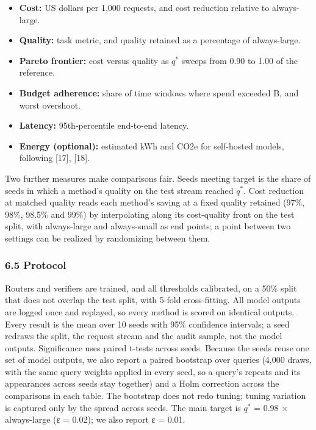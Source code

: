 \documentclass[
  10pt,
]{article}
\providecommand{\tightlist}{%
  \setlength{\itemsep}{0pt}\setlength{\parskip}{0pt}}
\begin{document}
\begin{itemize}
\tightlist
\item
  \textbf{Cost:} US dollars per 1,000 requests, and cost reduction
  relative to always-large.
\item
  \textbf{Quality:} task metric, and quality retained as a percentage of
  always-large.
\item
  \textbf{Pareto frontier:} cost versus quality as \(q^{*}\) sweeps from
  0.90 to 1.00 of the reference.
\item
  \textbf{Budget adherence:} share of time windows where spend exceeded
  B, and worst overshoot.
\item
  \textbf{Latency:} 95th-percentile end-to-end latency.
\item
  \textbf{Energy (optional):} estimated kWh and CO2e for self-hosted
  models, following {[}17{]}, {[}18{]}.
\end{itemize}

Two further measures make comparisons fair. Seeds meeting target is the
share of seeds in which a method's quality on the test stream reached
\(q^{*}\). Cost reduction at matched quality reads each method's saving
at a fixed quality retained (97\%, 98\%, 98.5\% and 99\%) by
interpolating along its cost-quality front on the test split, with
always-large and always-small as end points; a point between two
settings can be realized by randomizing between them.

\subsubsection{6.5 Protocol}\label{protocol}

Routers and verifiers are trained, and all thresholds calibrated, on a
50\% split that does not overlap the test split, with 5-fold
cross-fitting. All model outputs are logged once and replayed, so every
method is scored on identical outputs. Every result is the mean over 10
seeds with 95\% confidence intervals; a seed redraws the split, the
request stream and the audit sample, not the model outputs. Significance
uses paired t-tests across seeds. Because the seeds reuse one set of
model outputs, we also report a paired bootstrap over queries (4,000
draws, with the same query weights applied in every seed, so a query's
repeats and its appearances across seeds stay together) and a Holm
correction across the comparisons in each table. The bootstrap does not
redo tuning; tuning variation is captured only by the spread across
seeds. The main target is \(q^{*}\) = 0.98 × always-large (ε = 0.02); we
also report ε = 0.01.
\end{document}
